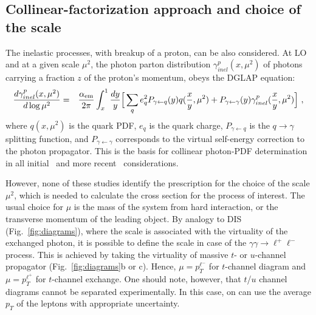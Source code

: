 \subsection{Collinear-factorization approach and choice of the scale}

The inelastic processes, with breakup of a proton, can be also considered.
At LO and at a given scale $\mu^2$, the photon parton distribution $\gamma^p_{inel}(x,\mu^2)$ of photons carrying a fraction $z$ of the proton's momentum, obeys the DGLAP equation:
\begin{eqnarray}
{d \gamma^p_{inel}(x,\mu^2) \over d \log \mu^2} =&& {\alpha_{\rm{em}} \over 2 \pi} \int_x^1 {dy \over y} 
\Big [ \sum_q e_q^2 P_{\gamma \leftarrow q}(y) 
 q ({x \over y}, \mu^2 )   + P_{\gamma \leftarrow \gamma}(y) \gamma^p_{inel}({x \over y},\mu^2) \Big ]~,
\end{eqnarray}
where $q (x,\mu^2)$ is the quark PDF, $e_q$ is the quark charge, $P_{\gamma \leftarrow q}$ is the $q\rightarrow\gamma$ splitting function, and $P_{\gamma \leftarrow \gamma}$ corresponds to the virtual self-energy correction to the photon propagator.
This is the basis for collinear photon-PDF determination in all initial~\cite{Gluck:2002fi, Martin:2004dh} and more recent~\cite{Ball:2013hta, Martin:2014nqa, Schmidt:2014aba, Harland-Lang:2016kog, Giuli:2017oii, Manohar:2016nzj, Bertone:2017bme} considerations.

However, none of these studies identify the prescription for the choice of the scale $\mu^2$, which is needed to calculate the cross section for the process of interest. 
The usual choice for $\mu$ is the mass of the system from hard interaction, or the transverse momentum of the leading object.
By analogy to DIS (Fig.~\ref{fig:diagrams}), where the scale is associated with the virtuality of the exchanged photon, it is possible to define the scale in case of the $\gamma\gamma\rightarrow\ell^+\ell^-$ process.
This is achieved by taking the virtuality of massive $t$- or $u$-channel propagator (Fig.~\ref{fig:diagrams}b or c).
Hence, $\mu = p_T^{\ell^-}$ for $t$-channel diagram and $\mu = p_T^{\ell^+}$ for $t$-channel exchange.
One should note, however, that $t$/$u$ channel diagrams cannot be separated experimentally. In this case, on can use the average $p_T$ of the leptons with appropriate uncertainty.

